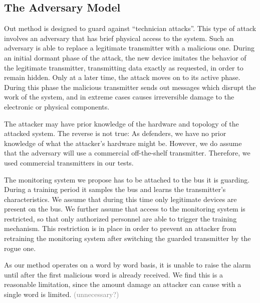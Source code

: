 \documentclass[conference]{IEEEtran}
\begin{document}
\subsection{The Adversary Model}
  Out method is designed to guard against ``technician attacks''. This type of attack involves an adversary that has brief physical access to the system. Such an adversary is able to replace a legitimate transmitter with a malicious one. During an initial dormant phase of the attack, the new device imitates the behavior of the legitimate transmitter, transmitting data exactly as requested, in order to remain hidden. Only at a later time, the attack moves on to its active phase. During this phase the malicious transmitter sends out messages which disrupt the work of the system, and in extreme cases causes irreversible damage to the electronic or physical components.
  

  The attacker may have prior knowledge of the hardware and topology of the attacked system. The reverse is not true: As defenders, we have no prior knowledge of what the attacker's hardware might be. However, we do assume that the adversary will use a commercial off-the-shelf transmitter. Therefore, we used commercial transmitters in our tests.

  The monitoring system we propose has to be attached to the bus it is guarding. During a training period it samples the bus and learns the transmitter's characteristics. We assume that during this time only legitimate devices are present on the bus. We further assume that access to the monitoring system is restricted, so that only authorized personnel are able to trigger the training mechanism. This restriction is in place in order to prevent an attacker from retraining the monitoring system after switching the guarded transmitter by the rogue one. 
  
  As our method operates on a word by word basis, it is unable to raise the alarm until after the first malicious word is already received. We find this is a reasonable limitation, since the amount damage an attacker can cause with a single word is limited. \textcolor{gray}{(unnecessary?)}
\end{document}
